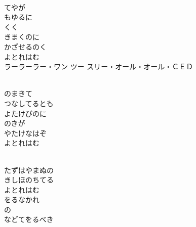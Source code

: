 \documentclass[10pt,b5j]{tarticle} %
\begin{document}
\vspace{1.5em} %
\newcommand{\linespace}{0.5em} %
\newcommand{\blocksize}{0.5\hsize} %
\newcommand{\itemmargin}{6em} %
\begin{enumerate} %
    \setlength{\itemindent}{\itemmargin} %
    \begin{minipage}[c]{\blocksize}
    
        \vspace{\linespace}
        \item~\\
        てやが\\
        もゆるに\\
        くく\\
        きまくのに\\
        かざせるのく\\
        よとれはむ\\
        ラーラーラー・ワン ツー スリー・オール・オール・ＣＥＤ
        
        \vspace{\linespace}
        \item~\\
        のまきて\\
        つなしてるとも\\
        よたけびのに\\
        のきが\\
        やたけなはぞ\\
        よとれはむ
        
        \vspace{\linespace}
        \item~\\
        たずはやまぬの\\
        きしほのちてる\\
        よとれはむ\\
        をるなかれ\\
        の\\
        などてをるべき
    
    \end{minipage}
\end{enumerate} %
\end{document}
